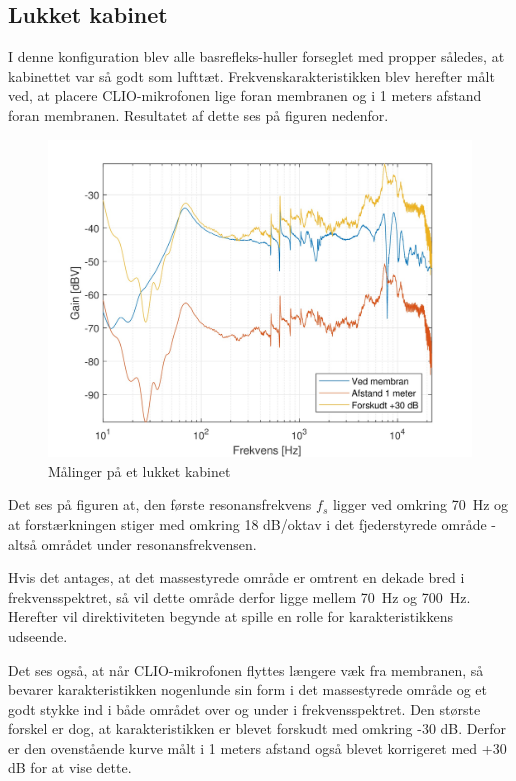 \subsection{Lukket kabinet}
I denne konfiguration blev alle basrefleks-huller forseglet med propper således, at kabinettet var så godt som lufttæt. Frekvenskarakteristikken blev herefter målt ved, at placere CLIO-mikrofonen lige foran membranen og i 1 meters afstand foran membranen. Resultatet af dette ses på figuren nedenfor.
\begin{figure}[H]
	\centering
	\vspace{-12pt}
	\includegraphics[width=\textwidth]{Pics/ClosedCabinet}
	\caption{Målinger på et lukket kabinet}
\end{figure}

Det ses på figuren at, den første resonansfrekvens $f_s$ ligger ved omkring \SI{70}{\hertz} og at forstærkningen stiger med omkring 18 dB/oktav i det fjederstyrede område - altså området under resonansfrekvensen.

Hvis det antages, at det massestyrede område er omtrent en dekade bred i frekvensspektret, så vil dette område derfor ligge mellem \SI{70}{\hertz} og \SI{700}{\hertz}. Herefter vil direktiviteten begynde at spille en rolle for karakteristikkens udseende.
 
Det ses også, at når CLIO-mikrofonen flyttes længere væk fra membranen, så bevarer karakteristikken nogenlunde sin form i det massestyrede område og et godt stykke ind i både området over og under i frekvensspektret. Den største forskel er dog, at karakteristikken er blevet forskudt med omkring -30 dB. Derfor er den ovenstående kurve målt i 1 meters afstand også blevet korrigeret med +30 dB for at vise dette.

